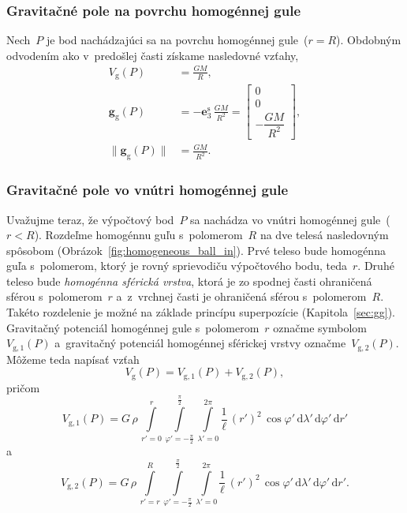 \documentclass[a4paper, 12pt]{book}
\newcommand{\diff}{\mathrm d}
\newcommand{\gidx}{\mathrm g}
\let\vec\mathbf
\begin{document}
\subsubsection{Gravitačné pole na povrchu homogénnej gule}

Nech~$P$ je bod nachádzajúci sa na povrchu homogénnej gule~($r = R$).  Obdobným 
odvodením ako v~predošlej časti získame nasledovné vzťahy,
%
\begin{align}
\label{eq:vg_ball_on}
V_\gidx(P) &= \frac{GM}{R}{,}\\
%
\vec g_\gidx(P) &= -\vec e_3^\mathrm{s} \, \frac{GM}{R^2} =
%
\begin{bmatrix}
0\\
0\\
-\dfrac{GM}{R^2}
\end{bmatrix}
{,}\\
%
\| \vec g_\gidx(P) \| &= \frac{GM}{R^2}{.}
\end{align}

\subsubsection{Gravitačné pole vo vnútri homogénnej gule}

Uvažujme teraz, že výpočtový bod~$P$ sa nachádza vo vnútri homogénnej gule~($r 
< R$).  Rozdeľme homogénnu guľu s~polomerom~$R$ na dve telesá nasledovným 
spôsobom (Obrázok~\ref{fig:homogeneous_ball_in}).  Prvé teleso bude homogénna 
guľa s~polomerom, ktorý je rovný sprievodiču výpočtového bodu, teda~$r$.  Druhé 
teleso bude \emph{homogénna sférická vrstva}, ktorá je zo spodnej časti 
ohraničená sférou s~polomerom~$r$ a~z~vrchnej časti je ohraničená sférou 
s~polomerom~$R$.  Takéto rozdelenie je možné na základe princípu superpozície 
(Kapitola~\ref{sec:gg}).  Gravitačný potenciál homogénnej gule s~polomerom~$r$ 
označme symbolom~$V_{\gidx,1}(P)$ a~gravitačný potenciál homogénnej sférickej 
vrstvy označme~$V_{\gidx,2}(P)$.  Môžeme teda napísať vzťah
%
\begin{equation}
\label{eq:vg_ball_in_split}
V_\gidx(P) = V_{\gidx,1}(P) + V_{\gidx,2}(P){,}
\end{equation}
%
pričom
%
\begin{equation}
V_{\gidx,1}(P) = G \, \rho \, \int\limits_{r' = 0}^{r} \int\limits_{\varphi' 
= -\frac{\pi}{2}}^{\frac{\pi}{2}} \int\limits_{\lambda' = 0}^{2\pi} 
\frac{1}{\ell} \, (r')^2 \, \cos\varphi' \, \diff \lambda' \, \diff \varphi' \, 
\diff r'
\end{equation}
%
a
%
\begin{equation}
\label{eq:vg_ball_in_2}
V_{\gidx,2}(P) = G \, \rho \, \int\limits_{r' = r}^{R} \int\limits_{\varphi' 
= -\frac{\pi}{2}}^{\frac{\pi}{2}} \int\limits_{\lambda' = 0}^{2\pi} 
\frac{1}{\ell} \, (r')^2 \, \cos\varphi' \, \diff \lambda' \, \diff \varphi' \, 
\diff r'{.}
\end{equation}
\end{document}
